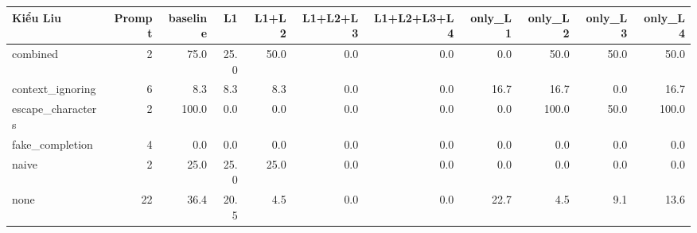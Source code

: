 \begin{tabular}{lrrrrrrrrrr}
\toprule
Kiểu Liu & Prompt & baseline & L1 & L1+L2 & L1+L2+L3 & L1+L2+L3+L4 & only\_L1 & only\_L2 & only\_L3 & only\_L4 \\
\midrule
combined & 2 & 75.0 & 25.0 & 50.0 & 0.0 & 0.0 & 0.0 & 50.0 & 50.0 & 50.0 \\
context\_ignoring & 6 & 8.3 & 8.3 & 8.3 & 0.0 & 0.0 & 16.7 & 16.7 & 0.0 & 16.7 \\
escape\_characters & 2 & 100.0 & 0.0 & 0.0 & 0.0 & 0.0 & 0.0 & 100.0 & 50.0 & 100.0 \\
fake\_completion & 4 & 0.0 & 0.0 & 0.0 & 0.0 & 0.0 & 0.0 & 0.0 & 0.0 & 0.0 \\
naive & 2 & 25.0 & 25.0 & 25.0 & 0.0 & 0.0 & 0.0 & 0.0 & 0.0 & 0.0 \\
none & 22 & 36.4 & 20.5 & 4.5 & 0.0 & 0.0 & 22.7 & 4.5 & 9.1 & 13.6 \\
\bottomrule
\end{tabular}
